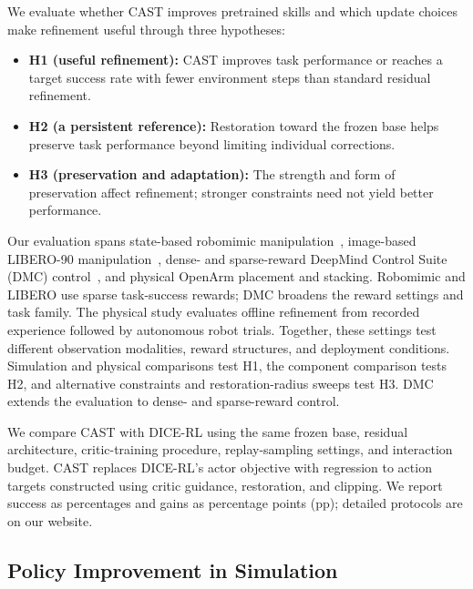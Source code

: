 We evaluate whether CAST improves pretrained skills and which update
choices make refinement useful through three hypotheses:
\begin{itemize}
\item \textbf{H1 (useful refinement):} CAST improves task performance or
reaches a target success rate with fewer environment steps than standard
residual refinement.
\item \textbf{H2 (a persistent reference):} Restoration toward the frozen
base helps preserve task performance beyond limiting individual corrections.
\item \textbf{H3 (preservation and adaptation):} The strength and form of
preservation affect refinement; stronger constraints need not yield
better performance.
\end{itemize}

\label{sec:exp-setup}
Our evaluation spans state-based robomimic manipulation~\cite{mandlekar2021robomimic},
image-based LIBERO-90 manipulation~\cite{liu2023libero}, dense- and sparse-reward DeepMind Control Suite (DMC) control~\cite{tassa2018dmc}, and physical OpenArm placement and stacking. Robomimic and LIBERO use sparse task-success rewards; DMC broadens the reward settings and task family. 
The physical study evaluates offline refinement from recorded experience followed by autonomous robot trials. Together, these settings test different observation modalities, reward structures, and deployment conditions. 
Simulation and physical comparisons test H1, the component comparison tests H2, and alternative constraints and restoration-radius sweeps test H3. 
DMC extends the evaluation to dense- and sparse-reward control.

We compare CAST with DICE-RL using the same frozen base, residual architecture, critic-training procedure, replay-sampling settings, and interaction budget. 
CAST replaces DICE-RL’s actor objective with regression to action targets constructed using critic guidance, restoration, and clipping. 
We report success as percentages and gains as percentage points (pp); detailed protocols are on our website.

\subsection{Policy Improvement in Simulation}
\label{sec:exp-libero}



